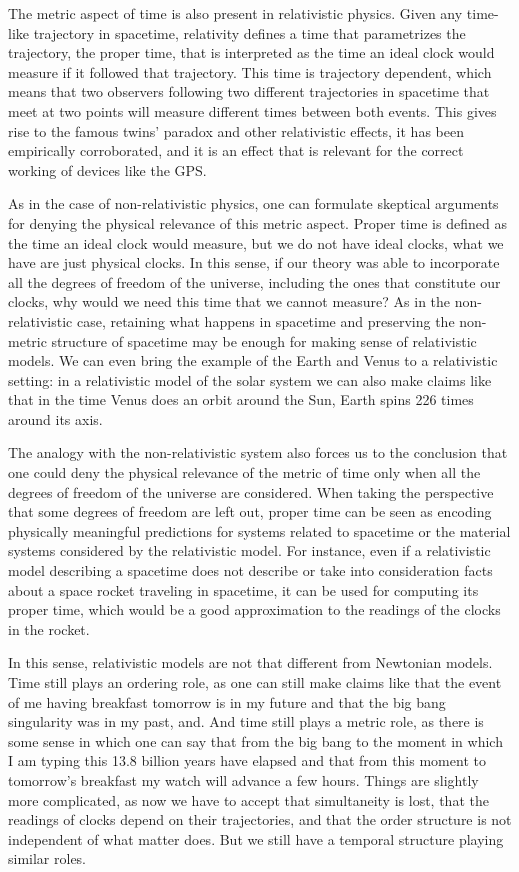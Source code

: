 \documentclass[12 pt]{article}
\begin{document}
The metric aspect of time is also present in relativistic physics. Given any time-like trajectory in spacetime, relativity defines a time that parametrizes the trajectory, the proper time, that is interpreted as the time an ideal clock would measure if it followed that trajectory. This time is trajectory dependent, which means that two observers following two different trajectories in spacetime that meet at two points will measure different times between both events. This gives rise to the famous twins' paradox and other relativistic effects, it has been empirically corroborated, and it is an effect that is relevant for the correct working of devices like the GPS.

As in the case of non-relativistic physics, one can formulate skeptical arguments for denying the physical relevance of this metric aspect. Proper time is defined as the time an ideal clock would measure, but we do not have ideal clocks, what we have are just physical clocks. In this sense, if our theory was able to incorporate all the degrees of freedom of the universe, including the ones that constitute our clocks, why would we need this time that we cannot measure? As in the non-relativistic case, retaining what happens in spacetime and preserving the non-metric structure of spacetime may be enough for making sense of relativistic models. We can even bring the example of the Earth and Venus to a relativistic setting: in a relativistic model of the solar system we can also make claims like that in the time Venus does an orbit around the Sun, Earth spins 226 times around its axis.

The analogy with the non-relativistic system also forces us to the conclusion that one could deny the physical relevance of the metric of time only when all the degrees of freedom of the universe are considered. When taking the perspective that some degrees of freedom are left out, proper time can be seen as encoding physically meaningful predictions for systems related to spacetime or the material systems considered by the relativistic model. For instance, even if a relativistic model describing a spacetime does not describe or take into consideration facts about a space rocket traveling in spacetime, it can be used for computing its proper time, which would be a good approximation to the readings of the clocks in the rocket.

In this sense, relativistic models are not that different from Newtonian models. Time still plays an ordering role, as one can still make claims like that the event of me having breakfast tomorrow is in my future and that the big bang singularity was in my past, and. And time still plays a metric role, as there is some sense in which one can say that from the big bang to the moment in which I am typing this 13.8 billion years have elapsed and that from this moment to tomorrow's breakfast my watch will advance a few hours. Things are slightly more complicated, as now we have to accept that simultaneity is lost, that the readings of clocks depend on their trajectories, and that the order structure is not independent of what matter does. But we still have a temporal structure playing similar roles.
\end{document}
